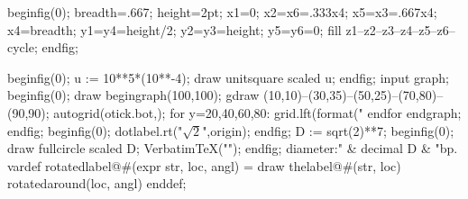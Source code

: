 \newbox\mympbox
\def\prependtomplibbox{\global\setbox\mympbox}%
\mplibcode
beginfig(0);
breadth=.667\mpdim\hsize;
height=2pt;
x1=0; x2=x6=.333x4; x5=x3=.667x4;
x4=breadth;
y1=y4=height/2; y2=y3=height; y5=y6=0;
fill z1--z2--z3--z4--z5--z6--cycle;
endfig;
\endmplibcode
\copy\mympbox
\copy\mympbox
\copy\mympbox
\copy\mympbox

\mplibnoforcehmode
{}%
\mplibcode
beginfig(0);
u := 10**5*(10**-4);
draw unitsquare scaled u;
endfig;
\endmplibcode
{}%
\mplibcode
  input graph;
  beginfig(0);
  draw begingraph(100,100);
    gdraw (10,10)--(30,35)--(50,25)--(70,80)--(90,90);
    autogrid(otick.bot,);
    for y=20,40,60,80:
      grid.lft(format("%
    endfor
    endgraph;
  endfig;
\endmplibcode
{}%
\mplibcode
beginfig(0);
dotlabel.rt("$\sqrt2$",origin);
endfig;
\endmplibcode
\leavevmode
\mplibcode
   D := sqrt(2)**7;
   beginfig(0);
   draw fullcircle scaled D;
   VerbatimTeX("\gdef\Dia{" & decimal D & "}");
   endfig;
\endmplibcode
diameter:\Dia bp.%
\mplibcode
  vardef rotatedlabel@#(expr str, loc, angl) =
    draw thelabel@#(str, loc) rotatedaround(loc, angl)
  enddef;

